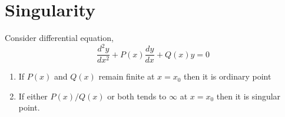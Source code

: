 \section{Singularity}
Consider differential equation,
\begin{equation}
\frac{d^2y}{dx^2} +P(x)\frac{dy}{dx}+Q(x)y=0
\end{equation}
\begin{enumerate}
	\item If $P(x)$ and $Q(x)$ remain finite at $x=x_0$ then it is ordinary point
	\item If either $P(x)/Q(x)$ or both tends to $\infty$ at $x=x_0$
	then it is singular point.
\end{enumerate}
